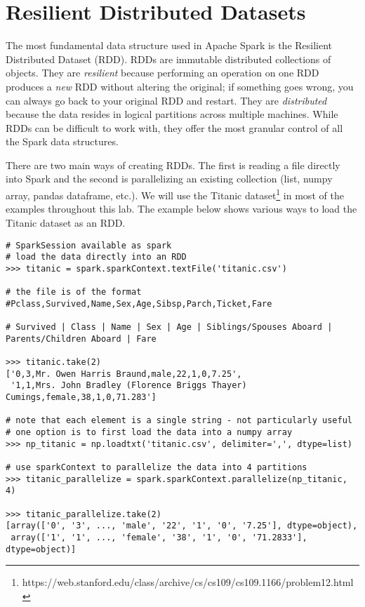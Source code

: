 \section*{Resilient Distributed Datasets} %
The most fundamental data structure used in Apache Spark is the Resilient Distributed Dataset (RDD).
RDDs are immutable distributed collections of objects.
They are \textit{resilient} because performing an operation on one RDD produces a \textit{new} RDD without altering the original; if something goes wrong, you can always go back to your original RDD and restart.
They are \textit{distributed} because the data resides in logical partitions across multiple machines.
While RDDs can be difficult to work with, they offer the most granular control of all the Spark data structures.

There are two main ways of creating RDDs. 
The first is reading a file directly into Spark and the second is parallelizing an existing collection (list, numpy array, pandas dataframe, etc.). 
We will use the Titanic dataset\footnote{https://web.stanford.edu/class/archive/cs/cs109/cs109.1166/problem12.html} in most of the examples throughout this lab.  
The example below shows various ways to load the Titanic dataset as an RDD.

\begin{lstlisting}
# SparkSession available as spark
# load the data directly into an RDD
>>> titanic = spark.sparkContext.textFile('titanic.csv')

# the file is of the format
#Pclass,Survived,Name,Sex,Age,Sibsp,Parch,Ticket,Fare

# Survived | Class | Name | Sex | Age | Siblings/Spouses Aboard | Parents/Children Aboard | Fare

>>> titanic.take(2)
['0,3,Mr. Owen Harris Braund,male,22,1,0,7.25',
 '1,1,Mrs. John Bradley (Florence Briggs Thayer) Cumings,female,38,1,0,71.283']

# note that each element is a single string - not particularly useful
# one option is to first load the data into a numpy array
>>> np_titanic = np.loadtxt('titanic.csv', delimiter=',', dtype=list)

# use sparkContext to parallelize the data into 4 partitions
>>> titanic_parallelize = spark.sparkContext.parallelize(np_titanic, 4)

>>> titanic_parallelize.take(2)
[array(['0', '3', ..., 'male', '22', '1', '0', '7.25'], dtype=object),
 array(['1', '1', ..., 'female', '38', '1', '0', '71.2833'], dtype=object)]
\end{lstlisting}

